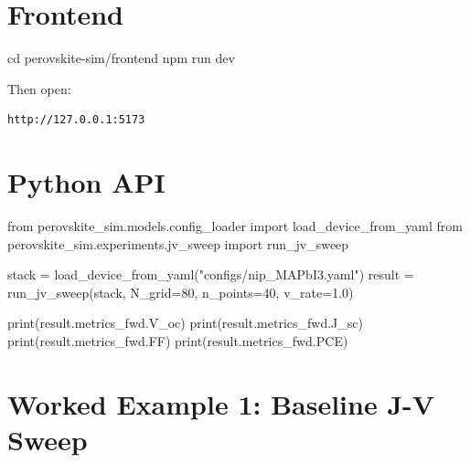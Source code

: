 \documentclass[
  11pt,
  american,
]{report}
\newenvironment{Shaded}{}{}
\newcommand{\BuiltInTok}[1]{#1}
\newcommand{\DecValTok}[1]{\textcolor[rgb]{0.25,0.63,0.44}{#1}}
\newcommand{\ExtensionTok}[1]{#1}
\newcommand{\FloatTok}[1]{\textcolor[rgb]{0.25,0.63,0.44}{#1}}
\newcommand{\ImportTok}[1]{#1}
\newcommand{\NormalTok}[1]{#1}
\newcommand{\OperatorTok}[1]{\textcolor[rgb]{0.40,0.40,0.40}{#1}}
\newcommand{\StringTok}[1]{\textcolor[rgb]{0.25,0.44,0.63}{#1}}
\begin{document}
\hypertarget{frontend}{%
\section{Frontend}\label{frontend}}

\begin{Shaded}
\begin{Highlighting}[]
\BuiltInTok{cd}\NormalTok{ perovskite{-}sim/frontend}
\ExtensionTok{npm}\NormalTok{ run dev}
\end{Highlighting}
\end{Shaded}

Then open:

\begin{verbatim}
http://127.0.0.1:5173
\end{verbatim}

\hypertarget{python-api}{%
\section{Python API}\label{python-api}}

\begin{Shaded}
\begin{Highlighting}[]
\ImportTok{from}\NormalTok{ perovskite\_sim.models.config\_loader }\ImportTok{import}\NormalTok{ load\_device\_from\_yaml}
\ImportTok{from}\NormalTok{ perovskite\_sim.experiments.jv\_sweep }\ImportTok{import}\NormalTok{ run\_jv\_sweep}

\NormalTok{stack }\OperatorTok{=}\NormalTok{ load\_device\_from\_yaml(}\StringTok{"configs/nip\_MAPbI3.yaml"}\NormalTok{)}
\NormalTok{result }\OperatorTok{=}\NormalTok{ run\_jv\_sweep(stack, N\_grid}\OperatorTok{=}\DecValTok{80}\NormalTok{, n\_points}\OperatorTok{=}\DecValTok{40}\NormalTok{, v\_rate}\OperatorTok{=}\FloatTok{1.0}\NormalTok{)}

\BuiltInTok{print}\NormalTok{(result.metrics\_fwd.V\_oc)}
\BuiltInTok{print}\NormalTok{(result.metrics\_fwd.J\_sc)}
\BuiltInTok{print}\NormalTok{(result.metrics\_fwd.FF)}
\BuiltInTok{print}\NormalTok{(result.metrics\_fwd.PCE)}
\end{Highlighting}
\end{Shaded}

\hypertarget{worked-example-1-baseline-j-v-sweep}{%
\section{Worked Example 1: Baseline J-V
Sweep}\label{worked-example-1-baseline-j-v-sweep}}
\end{document}
